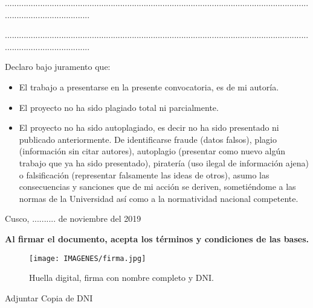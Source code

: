 \documentclass{article}
\begin{document}
.....................................................................................................................................................................

.....................................................................................................................................................................


Declaro bajo juramento que: 

\begin{itemize}
\item El trabajo a presentarse en la presente convocatoria, es de mi autoría. 
\item El proyecto no ha sido 
plagiado total ni parcialmente. 
\item El proyecto no ha sido autoplagiado, es decir no ha sido presentado ni publicado anteriormente. De 
identificarse fraude (datos falsos), plagio (información sin citar autores), autoplagio (presentar como 
nuevo algún trabajo que ya ha sido presentado), piratería (uso ilegal de 
información ajena) o falsificación (representar falsamente las ideas de otros), asumo las consecuencias 
y sanciones que de mi acción se deriven, sometiéndome a las normas de la Universidad así como a la 
normatividad nacional competente.
\end{itemize}

Cusco, .......... de noviembre del 2019




\textbf{Al firmar el documento, acepta los términos y condiciones de las bases.}

\begin{figure}[hbtp]
\centering
\texttt{[image: IMAGENES/firma.jpg]}
\caption{Huella digital, firma con nombre completo y DNI. }
\end{figure}

Adjuntar Copia de DNI
\end{document}
